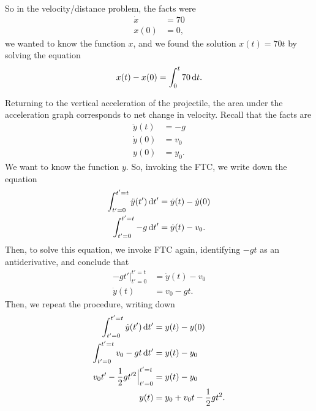 So in the velocity/distance problem, the facts were
\begin{align*}
    \dot{x} &= 70 \\
    x(0)    &= 0,
\end{align*}
we wanted to know the function $x$, and we found the solution $x(t) = 70t$ by solving the equation
\begin{align*}
    x(t) - x(0) = \int_0^t 70 \dt.
\end{align*}

Returning to the vertical acceleration of the projectile, the area under the acceleration graph
corresponds to net change in velocity. Recall that the facts are
\begin{align*}
    \ddot{y}(t) &= -g \\
    \dot{y}(0)  &= v_0 \\
    y(0)        &= y_0.
  \end{align*}
  We want to know the function $y$. So, invoking the FTC, we write down the equation
  \begin{align*}
    \int_{t'=0}^{t'=t}\ddot{y}(t') \dt' &= \dot{y}(t) - \dot{y}(0) \\
    \int_{t'=0}^{t'=t}-g \dt' &= \dot{y}(t) - v_0.
\end{align*}
Then, to solve this equation, we invoke FTC again, identifying $-gt$ as an antiderivative, and
conclude that
\begin{align*}
    -gt'\Big|_{t'=0}^{t'=t} &= \dot{y}(t) - v_0 \\
    \dot{y}(t)                   &= v_0 - gt.
\end{align*}
Then, we repeat the procedure, writing down
\begin{align*}
    \int_{t'=0}^{t'=t}\dot{y}(t') \dt' &= y(t) - y(0) \\
    \int_{t'=0}^{t'=t}v_0 - gt \dt'    &= y(t) - y_0 \\
    v_0t' - \frac{1}{2}gt'^2\Big|_{t'=0}^{t'=t} &= y(t) - y_0 \\
    y(t) &= y_0 + v_0t - \frac{1}{2}gt^2.
\end{align*}
